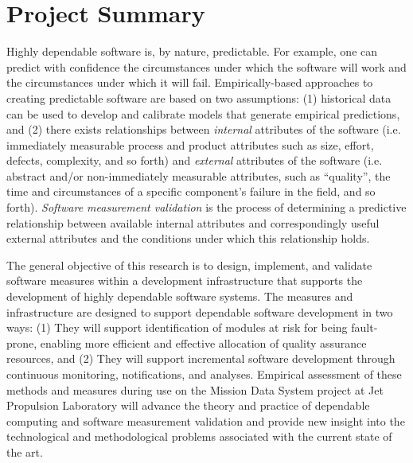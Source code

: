 
\pagestyle{empty}
\section*{Project Summary}

Highly dependable software is, by nature, predictable.  For example, one
can predict with confidence the circumstances under which the software will
work and the circumstances under which it will fail.  Empirically-based
approaches to creating predictable software are based on two assumptions:
(1) historical data can be used to develop and calibrate models that
generate empirical predictions, and (2) there exists relationships between
{\em internal} attributes of the software (i.e.  immediately measurable
process and product attributes such as size, effort, defects, complexity,
and so forth) and {\em external} attributes of the software (i.e. abstract
and/or non-immediately measurable attributes, such as ``quality'', the time
and circumstances of a specific component's failure in the field, and so
forth).  {\em Software measurement validation} is the process of
determining a predictive relationship between available internal attributes
and correspondingly useful external attributes and the conditions under
which this relationship holds.


The general objective of this research is to design, implement, and
validate software measures within a development infrastructure that
supports the development of highly dependable software systems. The
measures and infrastructure are designed to support dependable software
development in two ways: (1) They will support identification of modules at
risk for being fault-prone, enabling more efficient and effective
allocation of quality assurance resources, and (2) They will support
incremental software development through continuous monitoring,
notifications, and analyses.  Empirical assessment of these methods and
measures during use on the Mission Data System project at Jet Propulsion
Laboratory will advance the theory and practice of dependable computing and
software measurement validation and provide new insight into the
technological and methodological problems associated with the current state
of the art.

